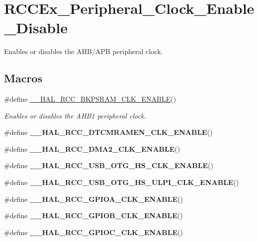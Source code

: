 \hypertarget{group___r_c_c_ex___peripheral___clock___enable___disable}{}\section{R\+C\+C\+Ex\+\_\+\+Peripheral\+\_\+\+Clock\+\_\+\+Enable\+\_\+\+Disable}
\label{group___r_c_c_ex___peripheral___clock___enable___disable}


Enables or disables the A\+H\+B/\+A\+PB peripheral clock.  


\subsection*{Macros}
\begin{DoxyCompactItemize}
\item 
\#define \mbox{\hyperlink{group___r_c_c_ex___peripheral___clock___enable___disable_ga0e00f0ad54ffe188998d9fa4dbc211f2}{\+\_\+\+\_\+\+H\+A\+L\+\_\+\+R\+C\+C\+\_\+\+B\+K\+P\+S\+R\+A\+M\+\_\+\+C\+L\+K\+\_\+\+E\+N\+A\+B\+LE}}()
\begin{DoxyCompactList}\small\item\em Enables or disables the A\+H\+B1 peripheral clock. \end{DoxyCompactList}\item 
\#define {\bfseries \+\_\+\+\_\+\+H\+A\+L\+\_\+\+R\+C\+C\+\_\+\+D\+T\+C\+M\+R\+A\+M\+E\+N\+\_\+\+C\+L\+K\+\_\+\+E\+N\+A\+B\+LE}()
\item 
\#define {\bfseries \+\_\+\+\_\+\+H\+A\+L\+\_\+\+R\+C\+C\+\_\+\+D\+M\+A2\+\_\+\+C\+L\+K\+\_\+\+E\+N\+A\+B\+LE}()
\item 
\#define {\bfseries \+\_\+\+\_\+\+H\+A\+L\+\_\+\+R\+C\+C\+\_\+\+U\+S\+B\+\_\+\+O\+T\+G\+\_\+\+H\+S\+\_\+\+C\+L\+K\+\_\+\+E\+N\+A\+B\+LE}()
\item 
\#define {\bfseries \+\_\+\+\_\+\+H\+A\+L\+\_\+\+R\+C\+C\+\_\+\+U\+S\+B\+\_\+\+O\+T\+G\+\_\+\+H\+S\+\_\+\+U\+L\+P\+I\+\_\+\+C\+L\+K\+\_\+\+E\+N\+A\+B\+LE}()
\item 
\#define {\bfseries \+\_\+\+\_\+\+H\+A\+L\+\_\+\+R\+C\+C\+\_\+\+G\+P\+I\+O\+A\+\_\+\+C\+L\+K\+\_\+\+E\+N\+A\+B\+LE}()
\item 
\#define {\bfseries \+\_\+\+\_\+\+H\+A\+L\+\_\+\+R\+C\+C\+\_\+\+G\+P\+I\+O\+B\+\_\+\+C\+L\+K\+\_\+\+E\+N\+A\+B\+LE}()
\item 
\#define {\bfseries \+\_\+\+\_\+\+H\+A\+L\+\_\+\+R\+C\+C\+\_\+\+G\+P\+I\+O\+C\+\_\+\+C\+L\+K\+\_\+\+E\+N\+A\+B\+LE}()
\item 

\end{DoxyCompactItemize}

